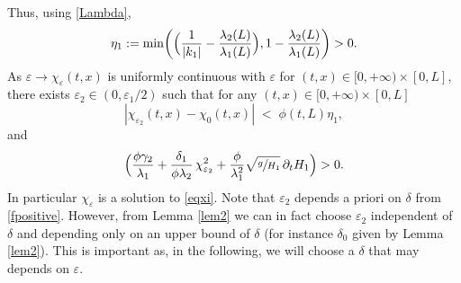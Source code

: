 \documentclass[JEP,XML,SOM,Unicode]{cedram}
\theoremstyle{definition}
\begin{document}
Thus, using \eqref{Lambda},
\begin{equation}
\label{defeta1}
\eta_{1}:=\min \biggl(\Bigl(\frac{1}{|k_{1}|}-\frac{\lambda_{2}(L)}{\lambda_{1}(L)} \Bigr),1-\frac{\lambda_{2}(L)}{\lambda_{1}(L)} \biggr)>0.
\end{equation}
As $\varepsilon\to \chi_{\varepsilon}(t,x)$ is uniformly continuous with $\varepsilon$ for $(t,x)\in[0,{+}\infty)\times[0,L]$,
there exists
$\varepsilon_{2}\in(0,\varepsilon_{1}/2)$ such that
for any $(t,x)\in[0,{+}\infty)\times[0,L]$
\begin{equation}
|\chi_{\varepsilon_{2}}(t,x)-\chi_{0}(t,x)| \;{<}\; \phi(t,L)\eta_{1},
\label{fL}
\end{equation}
and
\begin{equation}
\Bigl(\frac{\phi\gamma_{2}}{\lambda_{1}}+\frac{\delta_{1}}{\phi\lambda_{2}}\,\chi_{\varepsilon_{2}}^{2}+{\frac{\phi}{\lambda_{1}^{2}}}\sqrt{\sfrac{g}{H_{1}}}\,\partial_{t} H_{1} \Bigr)>0.
\label{fpositive}
\end{equation}
{In particular $\chi_{\varepsilon}$ is a solution to \eqref{eqxi}.}
Note that $\varepsilon_{2}$ depends a priori on $\delta$ from \eqref{fpositive}. However, from Lemma \ref{lem2}
we can in fact choose $\varepsilon_{2}$ independent of $\delta$ and depending only on an upper bound of $\delta$ (for instance $\delta_{0}$ given by Lemma \ref{lem2}). This is important as, in the following,
we will choose
a $\delta$ that may depends on $\varepsilon$.
\end{document}
